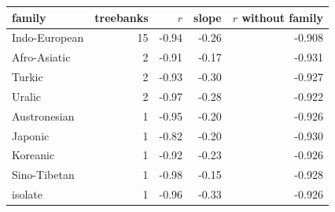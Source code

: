 \begin{tabular}{lrrrr}
\toprule
family & treebanks & $r$ & slope & $r$ without family \\
\midrule
Indo-European & 15 & -0.94 & -0.26 & -0.908 \\
Afro-Asiatic & 2 & -0.91 & -0.17 & -0.931 \\
Turkic & 2 & -0.93 & -0.30 & -0.927 \\
Uralic & 2 & -0.97 & -0.28 & -0.922 \\
Austronesian & 1 & -0.95 & -0.20 & -0.926 \\
Japonic & 1 & -0.82 & -0.20 & -0.930 \\
Koreanic & 1 & -0.92 & -0.23 & -0.926 \\
Sino-Tibetan & 1 & -0.98 & -0.15 & -0.928 \\
isolate & 1 & -0.96 & -0.33 & -0.926 \\
\bottomrule
\end{tabular}
